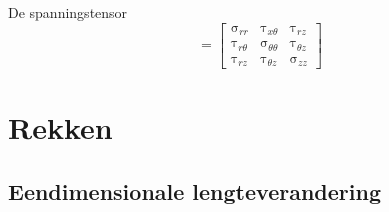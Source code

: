                 De spanningstensor
                \begin{equation}
                    [\upsigma] = \left[\begin{matrix}
                        \upsigma_{rr} & \uptau_{x\theta} & \uptau_{rz} \\
                        \uptau_{r\theta} & \upsigma_{\theta \theta} & \uptau_{\theta z} \\
                        \uptau_{rz} & \uptau_{\theta z} & \upsigma_{zz}
                    \end{matrix}\right]
                \end{equation}

    \section{Rekken}

        \subsection{Eendimensionale lengteverandering}